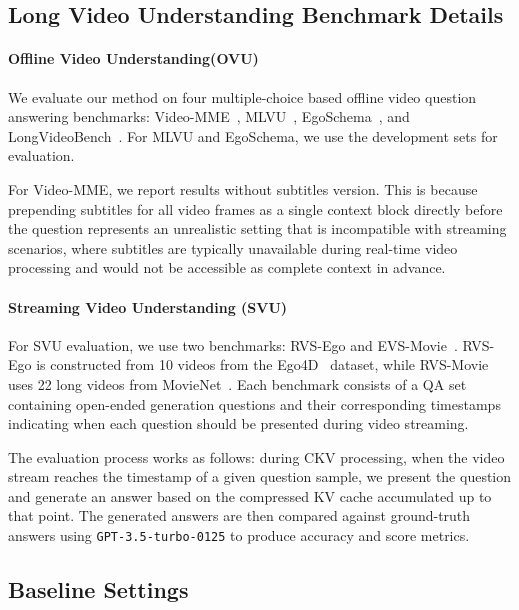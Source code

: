 \subsection{Long Video Understanding Benchmark Details} 
\paragraph{Offline Video Understanding(OVU)} We evaluate our method on four multiple-choice based offline video question answering benchmarks: Video-MME~\cite{fu2024videomme}, MLVU~\cite{MLVU}, EgoSchema~\cite{mangalam2023egoschema}, and LongVideoBench~\cite{wu2024longvideobench}. For MLVU and EgoSchema, we use the development sets for evaluation.

For Video-MME, we report results without subtitles version. This is because prepending subtitles for all video frames as a single context block directly before the question represents an unrealistic setting that is incompatible with streaming scenarios, where subtitles are typically unavailable during real-time video processing and would not be accessible as complete context in advance.

\paragraph{Streaming Video Understanding (SVU)} For SVU evaluation, we use two benchmarks: RVS-Ego and EVS-Movie~\cite{zhang2024flashvstream}. RVS-Ego is constructed from 10 videos from the Ego4D~\cite{Grauman_2022_CVPR} dataset, while RVS-Movie uses 22 long videos from MovieNet~\cite{huang2020movienet}. Each benchmark consists of a QA set containing open-ended generation questions and their corresponding timestamps indicating when each question should be presented during video streaming.

The evaluation process works as follows: during CKV processing, when the video stream reaches the timestamp of a given question sample, we present the question and generate an answer based on the compressed KV cache accumulated up to that point. The generated answers are then compared against ground-truth answers using \texttt{GPT-3.5-turbo-0125} to produce accuracy and score metrics.

\subsection{Baseline Settings}
